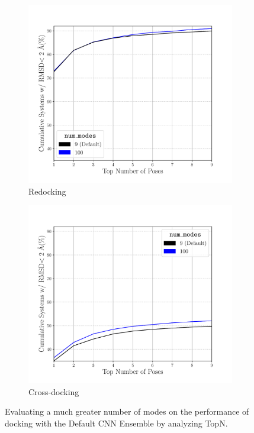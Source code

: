 \documentclass[journal=jcisd8,manuscript=article]{achemso}
\begin{document}
\begin{figure}    
        \begin{subfigure}[b]{0.48\textwidth}    
		\centering
		\includegraphics[width=\textwidth]{figures/redocking/sweep_num_modes_line.pdf}
		\caption{Redocking}
		\label{fig:num modes rd}
        \end{subfigure}    
        \begin{subfigure}[b]{0.48\textwidth}    
		\centering
		\includegraphics[width=\textwidth]{figures/crossdocking/sweep_num_modes_line.pdf}
		\caption{Cross-docking}
		\label{fig:num modes cd}
        \end{subfigure}    
	\caption{Evaluating a much greater number of modes on the performance of docking with the Default CNN Ensemble by analyzing TopN.}
	\label{fig:num modes}
\end{figure}
\end{document}
